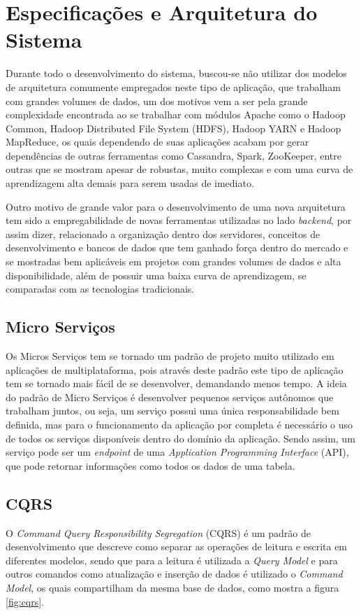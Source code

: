 \chapter{Especificações e Arquitetura do Sistema}
\label{chap:arquitetura}
Durante todo o desenvolvimento do sistema, buscou-se não utilizar dos modelos de arquitetura comumente empregados neste tipo de aplicação, que trabalham com grandes volumes de dados, um dos motivos vem a ser pela grande complexidade encontrada ao se trabalhar com módulos Apache como o Hadoop Common, Hadoop Distributed File System (HDFS), Hadoop YARN e Hadoop MapReduce, os quais dependendo de suas aplicações acabam por gerar dependências de outras ferramentas como Cassandra, Spark, ZooKeeper, entre outras que se mostram apesar de robustas, muito complexas e com uma curva de aprendizagem alta demais para serem usadas de imediato.

Outro motivo de grande valor para o desenvolvimento de uma nova arquitetura tem sido a empregabilidade de novas ferramentas utilizadas no lado \textit{backend}, por assim dizer, relacionado a organização dentro dos servidores, conceitos de desenvolvimento e bancos de dados que tem ganhado força dentro do mercado e se mostradas bem aplicáveis em projetos com grandes volumes de dados e alta disponibilidade, além de possuir uma baixa curva de aprendizagem, se comparadas com as tecnologias tradicionais.

\section{Micro Serviços}
\label{sec:microserviços}
Os Micros Serviços tem se tornado um padrão de projeto muito utilizado em aplicações de multiplataforma, pois através deste padrão este tipo de aplicação tem se tornado mais fácil de se desenvolver, demandando menos tempo. A ideia do padrão de Micro Serviços é desenvolver pequenos serviços autônomos que trabalham juntos, ou seja, um serviço possui uma única responsabilidade bem definida, mas para o funcionamento da aplicação por completa é necessário o uso de todos os serviços disponíveis dentro do domínio da aplicação. Sendo assim, um serviço pode ser um \textit{endpoint} de uma \textit{Application Programming Interface} (API), que pode retornar informações como todos os dados de uma tabela.~\cite{newman2015building}

\section{CQRS}
O \textit{Command Query Responsibility Segregation} (CQRS) é um padrão de desenvolvimento que descreve como separar as operações de leitura e escrita em diferentes modelos, sendo que para a leitura é utilizada a \textit{Query Model} e para outros comandos como atualização e inserção de dados é utilizado o \textit{Command Model}, os quais compartilham da mesma base de dados, como mostra a figura \ref{fig:cqrs}.

